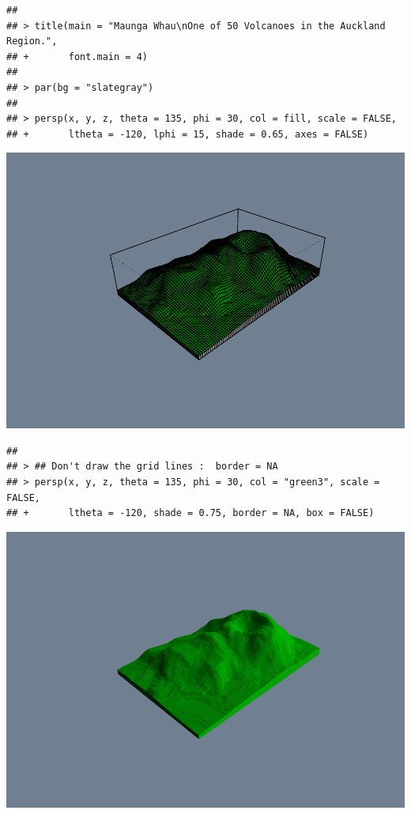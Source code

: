 \documentclass[]{book}
\begin{document}
\begin{verbatim}
## 
## > title(main = "Maunga Whau\nOne of 50 Volcanoes in the Auckland Region.",
## +       font.main = 4)
## 
## > par(bg = "slategray")
## 
## > persp(x, y, z, theta = 135, phi = 30, col = fill, scale = FALSE,
## +       ltheta = -120, lphi = 15, shade = 0.65, axes = FALSE)
\end{verbatim}

\includegraphics{TudodoR_files/figure-latex/unnamed-chunk-146-5.pdf}

\begin{verbatim}
## 
## > ## Don't draw the grid lines :  border = NA
## > persp(x, y, z, theta = 135, phi = 30, col = "green3", scale = FALSE,
## +       ltheta = -120, shade = 0.75, border = NA, box = FALSE)
\end{verbatim}

\includegraphics{TudodoR_files/figure-latex/unnamed-chunk-146-6.pdf}
\end{document}
